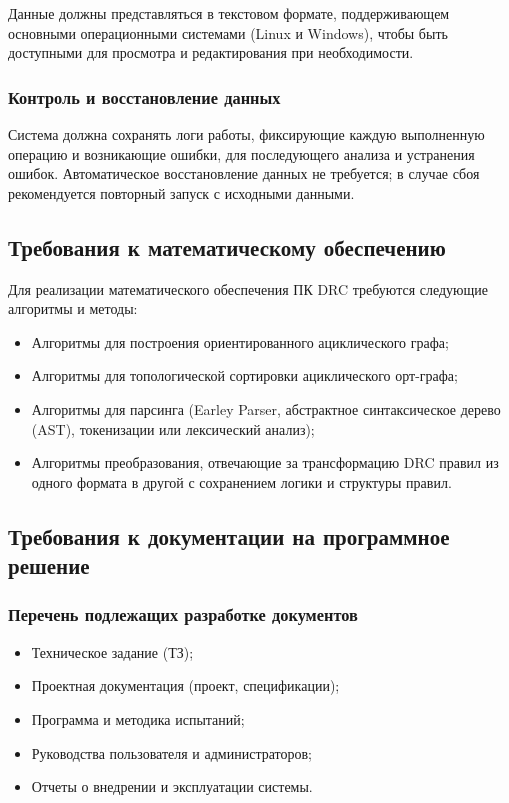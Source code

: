 Данные должны представляться в текстовом формате,
поддерживающем основными операционными системами (Linux и Windows),
чтобы быть доступными для просмотра и редактирования при необходимости.

\subsubsection{Контроль и восстановление данных}

Система должна сохранять логи работы, фиксирующие каждую выполненную операцию
и возникающие ошибки, для последующего анализа и устранения ошибок.
Автоматическое восстановление данных не требуется;
в случае сбоя рекомендуется повторный запуск с исходными данными.

\subsection{Требования к математическому обеспечению}

Для реализации математического обеспечения ПК DRC
требуются следующие алгоритмы и методы:

\begin{itemize}
	\item Алгоритмы для построения ориентированного ациклического графа;
	\item Алгоритмы для топологической сортировки ациклического орт-графа;
	\item Алгоритмы для парсинга
		(Earley Parser, абстрактное синтаксическое дерево (AST),
		токенизации или лексический анализ);
	\item Алгоритмы преобразования, отвечающие за трансформацию DRC
		правил из одного формата в другой с сохранением логики
		и структуры правил.
\end{itemize}

\subsection{Требования к документации на программное решение}

\subsubsection{Перечень подлежащих разработке документов}

\begin{itemize}
	\item Техническое задание (ТЗ);
	\item Проектная документация (проект, спецификации);
	\item Программа и методика испытаний;
	\item Руководства пользователя и администраторов;
	\item Отчеты о внедрении и эксплуатации системы.
\end{itemize}

